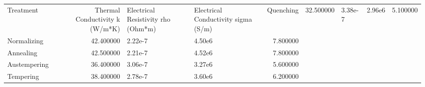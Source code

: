 \begin{tabular}{lrllr}
\toprule
Treatment & Thermal Conductivity k (W/m*K) & Electrical Resistivity rho (Ohm*m) & Electrical Conductivity sigma (S/m) & %
\midrule
Quenching & 32.500000 & 3.38e-7 & 2.96e6 & 5.100000 \\
Normalizing & 42.400000 & 2.22e-7 & 4.50e6 & 7.800000 \\
Annealing & 42.500000 & 2.21e-7 & 4.52e6 & 7.800000 \\
Austempering & 36.400000 & 3.06e-7 & 3.27e6 & 5.600000 \\
Tempering & 38.400000 & 2.78e-7 & 3.60e6 & 6.200000 \\
\bottomrule
\end{tabular}
